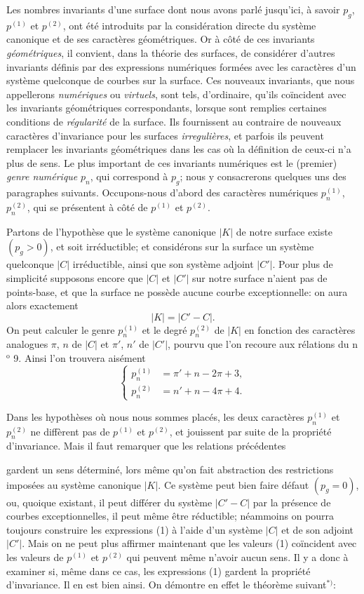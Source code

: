 \documentclass{article}
\begin{document}
Les nombres invariants d'une surface dont nous avons parlé jusqu'ici, à savoir $p_{g}$, $p^{(1)}$ et $p^{(2)}$, ont été introduits par la considération directe du système canonique et de ses caractères géométriques. Or à côté de ces invariants \emph{géométriques}, il convient, dans la théorie des surfaces, de considérer d'autres invariants définis par des expressions numériques formées avec les caractères d'un système quelconque de courbes sur la surface. Ces nouveaux invariants, que nous appellerons \emph{numériques} ou \emph{virtuels}, sont tels, d'ordinaire, qu'ils coïncident avec les invariants géométriques correspondants, lorsque sont remplies certaines conditions de \emph{régularité} de la surface. Ils fournissent au contraire de nouveaux caractères d'invariance pour les surfaces \emph{irregulières}, et parfois ils peuvent remplacer les invariants géométriques dans les cas où la définition de ceux-ci n'a plus de sens. Le plus important de ces invariants numériques est le (premier) \emph{genre numérique} $p_{n}$, qui correspond à $p_{g}$; nous y consacrerons quelques uns des paragraphes suivants. Occupons-nous d'abord des caractères numériques $p_{n}^{(1)}$, $p_{n}^{(2)}$, qui se présentent à côté de $p^{(1)}$ et $p^{(2)}$.

Partons de l'hypothèse que le système canonique $|K|$ de notre surface existe $(p_{g} > 0)$, et soit irréductible; et considérons sur la surface un système quelconque $|C|$ irréductible, ainsi que son système adjoint $|C'|$. Pour plus de simplicité supposons encore que $|C|$ et $|C'|$ sur notre surface n'aient pas de points-base, et que la surface ne possède aucune courbe exceptionnelle: on aura alors exactement
\[
|K| = |C' - C|.
\]
On peut calculer le genre $p_{n}^{(1)}$ et le degré $p_{n}^{(2)}$ de $|K|$ en fonction des caractères analogues $\pi$, $n$ de $|C|$ et $\pi'$, $n'$ de $|C'|$, pourvu que l'on recoure aux rélations du n${}^{\text{o}}$ 9. Ainsi l'on trouvera aisément
\[
\left\{
\begin{aligned}
p_{n}^{(1)} &= \pi' + n - 2\pi + 3,\\
p_{n}^{(2)} &= n' + n - 4\pi + 4.
\end{aligned}
\right.
\tag{1}
\]

Dans les hypothèses où nous nous sommes placés, les deux caractères $p_{n}^{(1)}$ et $p_{n}^{(2)}$ ne diffèrent pas de $p^{(1)}$ et $p^{(2)}$, et jouissent par suite de la propriété d'invariance. Mais il faut remarquer que les relations précédentes

gardent un sens déterminé, lors même qu'on fait abstraction des restrictions imposées au système canonique $|K|$. Ce système peut bien faire défaut $(p_{g} = 0)$, ou, quoique existant, il peut différer du système $|C' - C|$ par la présence de courbes exceptionnelles, il peut même être réductible; néammoins on pourra toujours construire les expressions (1) à l'aide d'un système $|C|$ et de son adjoint $|C'|$. Mais on ne peut plus affirmer maintenant que les valeurs (1) coïncident avec les valeurs de $p^{(1)}$ et $p^{(2)}$ qui peuvent même n'avoir aucun sens. Il y a donc à examiner si, même dans ce cas, les expressions (1) gardent la propriété d'invariance. Il en est bien ainsi. On démontre en effet le théorème suivant${}^{*)}$:
\end{document}
